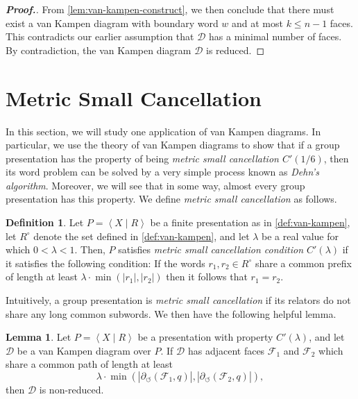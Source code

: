 \documentclass[11pt,a4paper,reqno]{amsart}
\theoremstyle{plain}
\theoremstyle{definition}
\newtheorem{lemma}[theorem]{Lemma}
\newtheorem{definition}[theorem]{Definition}
\theoremstyle{definition}
\renewcommand\leq\leqslant
\newenvironment{myproof}{\begin{proof}[\normalfont\bfseries Proof.]}{\end{proof}}
\begin{document}
\begin{myproof}
	From \cref{lem:van-kampen-construct}, we then conclude that there must exist a van Kampen diagram with boundary word $w$ and at most $k\leq n-1$ faces.
	This contradicts our earlier assumption that $\mathcal D$ has a minimal number of faces.
	By contradiction, the van Kampen diagram $\mathcal D$ is reduced.
\end{myproof}

\section{Metric Small Cancellation}\label{sec:metric-small-cancellation}

In this section, we will study one application of van Kampen diagrams.
In particular, we use the theory of van Kampen diagrams to show that if a group presentation has the property of being \emph{metric small cancellation $C'(1/6)$}, then its word problem can be solved by a very simple process known as \emph{Dehn's algorithm}.
Moreover, we will see that in some way, almost every group presentation has this property.
We define \emph{metric small cancellation} as follows.

\begin{definition}\label{def:small-cancel}
	Let $P = \left\langle X \mid R\right\rangle$ be a finite presentation as in \cref{def:van-kampen}, let $R^\circ$ denote the set defined in \cref{def:van-kampen}, and let $\lambda$ be a real value for which $0 < \lambda< 1$.
	Then, $P$ satisfies \emph{metric small cancellation condition $C'(\lambda)$} if it satisfies the following condition:
	If the words $r_1,r_2\in R^\circ$ share a common prefix of length at least $\lambda\cdot \min(|r_1|, |r_2|)$ then it follows that $r_1=r_2$.
\end{definition}

Intuitively, a group presentation is \emph{metric small cancellation} if its relators do not share any long common subwords.
We then have the following helpful lemma.

\begin{lemma}\label{lem:reduced}
	Let $P = \left\langle X \mid R \right\rangle$ be a presentation with property $C'(\lambda)$, and let $\mathcal D$ be a van Kampen diagram over $P$.
	If $\mathcal D$ has adjacent faces $\mathcal F_1$ and $\mathcal F_2$ which share a common path of length at least
	\[
		\lambda \cdot \min \left(
		\left|\partial_\circlearrowleft (\mathcal F_1, q)\right|,
		\left|\partial_\circlearrowleft (\mathcal F_2, q)\right| \right),
	\]
	then $\mathcal D$ is non-reduced.
\end{lemma}
\end{document}
